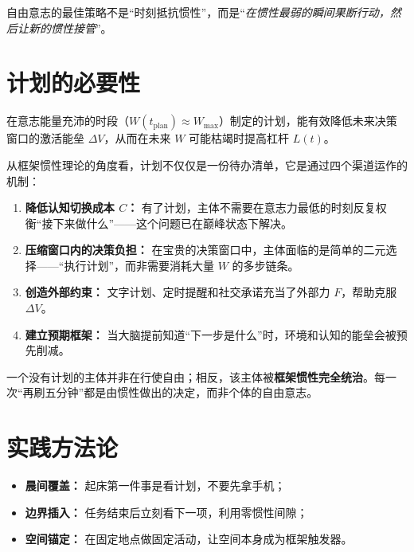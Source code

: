 \begin{insightbox}
自由意志的最佳策略不是“时刻抵抗惯性”，而是“\emph{在惯性最弱的瞬间果断行动，然后让新的惯性接管}”。
\end{insightbox}

\section{计划的必要性}\label{sec:planning}

\begin{theorem}[计划作为预设轨道]\label{thm:planning}
在意志能量充沛的时段（$W(t_{\text{plan}}) \approx W_{\max}$）制定的计划，能有效降低未来决策窗口的激活能垒 $\Delta V$，从而在未来 $W$ 可能枯竭时提高杠杆 $L(t)$。
\end{theorem}

\begin{discussion}
从框架惯性理论的角度看，计划不仅仅是一份待办清单，它是通过四个渠道运作的机制：
\begin{enumerate}
  \item \textbf{降低认知切换成本 $C$：} 有了计划，主体不需要在意志力最低的时刻反复权衡“接下来做什么”——这个问题已在巅峰状态下解决。
  \item \textbf{压缩窗口内的决策负担：} 在宝贵的决策窗口中，主体面临的是简单的二元选择——“执行计划”，而非需要消耗大量 $W$ 的多步链条。
  \item \textbf{创造外部约束：} 文字计划、定时提醒和社交承诺充当了外部力 $F$，帮助克服 $\Delta V$。
  \item \textbf{建立预期框架：} 当大脑提前知道“下一步是什么”时，环境和认知的能垒会被预先削减。
\end{enumerate}
\end{discussion}

\begin{corollary}[无计划者非自由]\label{cor:unfree}
一个没有计划的主体并非在行使自由；相反，该主体被\textbf{框架惯性完全统治}。每一次“再刷五分钟”都是由惯性做出的决定，而非个体的自由意志。
\end{corollary}

\section{实践方法论}\label{sec:practice}

\begin{methodbox}[title={方法 1：利用决策窗口}]
\begin{itemize}[nosep]
  \item \textbf{晨间覆盖：} 起床第一件事是看计划，不要先拿手机；
  \item \textbf{边界插入：} 任务结束后立刻看下一项，利用零惯性间隙；
  \item \textbf{空间锚定：} 在固定地点做固定活动，让空间本身成为框架触发器。
\end{itemize}
\end{methodbox}

